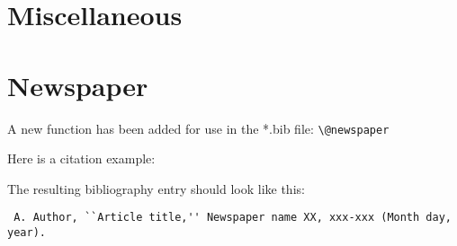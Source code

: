 \documentclass[preprint, NumberedRefs]{JASA}
\begin{document}
\section*{Miscellaneous}
\cite{sampMisc}

\section*{Newspaper}
A new function has been added for use in the *.bib file: \verb+\@newspaper+

Here is a citation example: \cite{newspaperSamp}

The resulting bibliography entry should look like this:

\verb+ A. Author, ``Article title,'' Newspaper name XX, xxx-xxx (Month day, year).+


\end{document}
